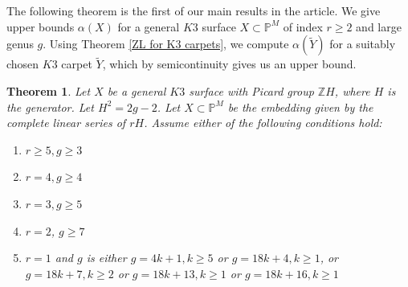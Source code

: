 \documentclass[11pt,twoside]{amsart}
\theoremstyle{plain}
\numberwithin{equation}{section}
\newtheorem{theorem}{Theorem}[section]
\theoremstyle{definition}
\begin{document}
The following theorem is the first of our main results in the article. We give upper bounds $\alpha(X)$ for a general $K3$ surface $X \subset \mathbb{P}^M$ of index $r \geq 2$ and large genus $g$. Using Theorem \ref{ZL for K3 carpets}, we compute $\alpha(\widetilde{Y})$ for a suitably chosen $K3$ carpet $\widetilde{Y}$, which by semicontinuity gives us an upper bound. 

\begin{theorem}\label{non-extendability of K3 surfaces}
    Let $X$ be a general $K3$ surface with Picard group $\mathbb{Z}H$, where $H$ is the generator. Let $H^2 = 2g-2$. Let $X \subset \mathbb{P}^M$ be the embedding given by the complete linear series of $rH$. Assume either of the following conditions hold:
    \begin{enumerate}
        \item[(1)] $r \geq 5, g \geq 3$
        \item[(2)] $r = 4, g \geq 4$
        \item[(3)] $r = 3, g \geq 5$ 
        \item[(4)] $r = 2$, $g \geq 7$ 
        \item[(5)] $r = 1$ and $g$ is either $g = 4k+1, k \geq 5$ or $g = 18k+4, k \geq 1$, or $g = 18k+7, k \geq 2$ or $g = 18k+13, k \geq 1$ or $g = 18k+16, k \geq 1$
        
        
        
        
    \end{enumerate}
\end{theorem}
\end{document}
